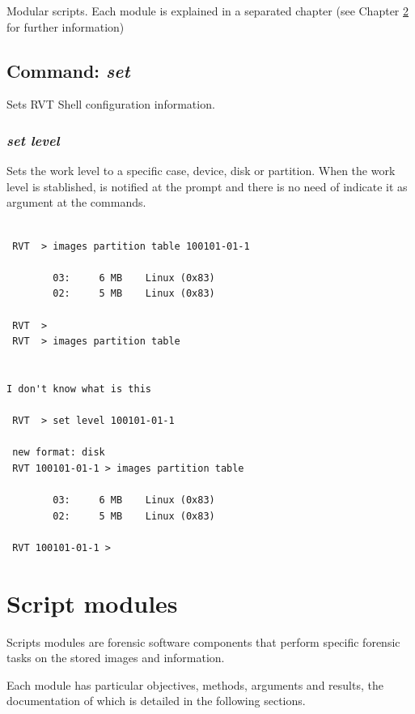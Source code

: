 \documentclass[a4paper,11pt,oneside]{report}
\begin{document}
Modular scripts. Each module is explained in a separated chapter (see Chapter \ref{sec:modules} for further information)


\section{Command: \emph{set}}

Sets RVT Shell configuration information.

\subsection{\emph{set level}}  \label{cmd:set-level}

Sets the work level to a specific case, device, disk or partition. When the work level is stablished, is notified at the prompt and there is no need of indicate it as argument at the commands.

\begin{verbatim}

 RVT  > images partition table 100101-01-1                                    

        03:     6 MB    Linux (0x83)
        02:     5 MB    Linux (0x83)

 RVT  > 
 RVT  > images partition table


I don't know what is this

 RVT  > set level 100101-01-1                                                 

 new format: disk
 RVT 100101-01-1 > images partition table                                     

        03:     6 MB    Linux (0x83)
        02:     5 MB    Linux (0x83)

 RVT 100101-01-1 > 
\end{verbatim}












\chapter{Script modules} \label{sec:modules}

Scripts modules are forensic software components that perform specific forensic tasks on the stored images and information.

Each module has particular objectives, methods, arguments and results, the documentation of which is detailed in the following sections.
\end{document}
